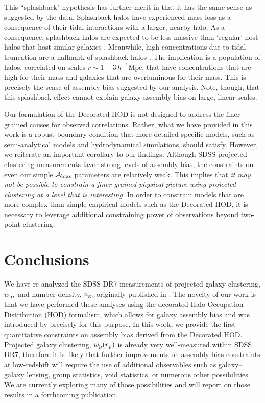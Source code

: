 \documentclass[usenatbib,usegraphicx,letterpaper]{mn2e}
\newcommand{\abias}{\mathcal{A}_{\rm bias}}
\newcommand{\wprp}{w_{\mathrm{p}}}
\begin{document}
This ``splashback" hypothesis has further merit in that it has the
same sense as suggested by the data. Splashback halos have experienced
mass loss as a consequence of their tidal interactions with a larger,
nearby halo. As a consequence, splashback halos are expected to be
less massive than `regular' host halos that host similar galaxies
\citep{dalal_etal08}.  Meanwhile, high concentrations due to tidal
truncation are a hallmark of splashback halos
\citep{sunayama_etal16}.  The implication is
a population of halos, correlated on scales $r \sim 1-3\,
h^{-1}\mathrm{Mpc}$, that have concentrations that are high for their
mass and galaxies that are overluminous for their mass. This is
precisely the sense of assembly bias suggested by our analysis.  Note,
though, that this splashback effect cannot explain galaxy assembly
bias on large, linear scales.

Our formulation of the Decorated HOD is not designed to address 
the finer-grained causes for observed correlations. 
Rather, what we have provided in this work is a robust boundary condition 
that more detailed specific models, such as semi-analytical models 
and hydrodynamical simulations, should satisfy. 
However, we reiterate an important corollary to our findings. 
Although SDSS projected clustering measurements favor strong levels of assembly bias, 
the constraints on even our simple $\abias$ parameters are relatively weak. 
This implies that {\em it may not be possible to constrain a finer-grained physical 
picture using projected clustering at a level that is interesting.} 
In order to constrain models that are more complex than simple empirical models 
such as the Decorated HOD, it is necessary to leverage additional constraining power of 
observations beyond two-point clustering. 


\section{Conclusions}
\label{section:conclusions}

We have re-analyzed the SDSS DR7 measurements of projected galaxy clustering,
$\wprp,$ and number density, $n_{\rm g},$ originally published in \citet{zehavi_etal11}.
The novelty of our work is that we have performed these analyses using the
decorated Halo Occupation Distribution (HOD) formalism, which allows for galaxy
assembly bias and was introduced by \citet{hearin_etal16} precisely for this purpose.
In this work, we provide the first quantitative constraints on
assembly bias derived from the Decorated HOD. Projected galaxy clustering, 
$\wprp(r_{\rm p})$ is already very well-measured within SDSS DR7, therefore it is likely 
that further improvements on assembly bias constraints at low-redshift will require the use of additional 
observables such as galaxy--galaxy lensing, group statistics, void statistics, or numerous other possibilities. 
We are currently exploring many of those possibilities and will report on those results in a forthcoming publication. 
\end{document}
